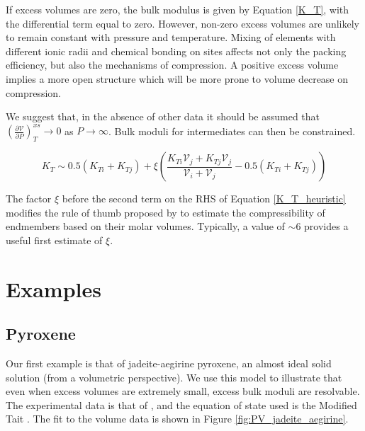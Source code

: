 \documentclass[review]{elsarticle}
\begin{document}
If excess volumes are zero, the bulk modulus is given by Equation \ref{K_T}, with the differential term equal to zero. However, non-zero excess volumes are unlikely to remain constant with pressure and temperature. Mixing of elements with different ionic radii and chemical bonding on sites affects not only the packing efficiency, but also the mechanisms of compression. A positive excess volume implies a more open structure which will be more prone to volume decrease on compression.

We suggest that, in the absence of other data it should be assumed that $\left( \frac{\partial \mathcal{V}}{\partial P} \right)_T^{xs} \rightarrow 0$ as $P \rightarrow \infty$. Bulk moduli for intermediates can then be constrained. 

\begin{equation}
  K_{T} \sim 0.5(K_{Ti} + K_{Tj}) + \xi \left(\frac{K_{Ti}\mathcal{V}_{j} + K_{Tj}\mathcal{V}_{j}}{\mathcal{V}_{i} + \mathcal{V}_{j}} - 0.5(K_{Ti} + K_{Tj})\right)
  \label{K_T_heuristic}
\end{equation}

The factor $\xi$ before the second term on the RHS of Equation \ref{K_T_heuristic} modifies the rule of thumb proposed by \cite{AA1970} to estimate the compressibility of endmembers based on their molar volumes. Typically, a value of $\sim$6 provides a useful first estimate of $\xi$. 

\section{Examples}
\subsection{Pyroxene}
Our first example is that of jadeite-aegirine pyroxene, an almost ideal solid solution (from a volumetric perspective). We use this model to illustrate that even when excess volumes are extremely small, excess bulk moduli are resolvable. The experimental data is that of \cite{NBLBT2006}, and the equation of state used is the Modified Tait \citep{HP2011}. The fit to the volume data is shown in Figure \ref{fig:PV_jadeite_aegirine}.
\end{document}
